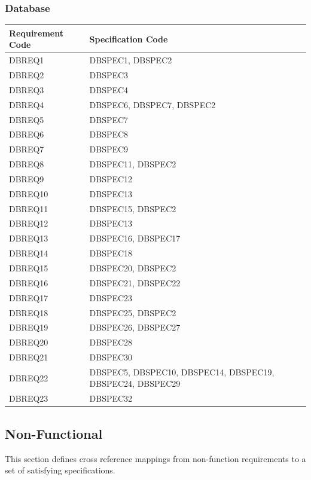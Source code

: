 \documentclass[11pt,a4paper]{article}
\begin{document}
\subsubsection{Database}

\begin{longtable}{|p{2.7cm}|p{10cm}|}
\hline
\textbf{Requirement Code} & \textbf{Specification Code} \\
\hline
{DBREQ1} &
{DBSPEC1, DBSPEC2}\\\hline
{DBREQ2} &
{DBSPEC3}\\\hline
{DBREQ3} &
{DBSPEC4}\\\hline
{DBREQ4} &
{DBSPEC6, DBSPEC7, DBSPEC2}\\\hline
{DBREQ5} &
{DBSPEC7}\\\hline
{DBREQ6} &
{DBSPEC8}\\\hline
{DBREQ7} &
{DBSPEC9}\\\hline
{DBREQ8} &
{DBSPEC11, DBSPEC2}\\\hline
{DBREQ9} &
{DBSPEC12}\\\hline
{DBREQ10} &
{DBSPEC13}\\\hline
{DBREQ11} &
{DBSPEC15, DBSPEC2}\\\hline
{DBREQ12} &
{DBSPEC13}\\\hline
{DBREQ13} &
{DBSPEC16, DBSPEC17}\\\hline
{DBREQ14} &
{DBSPEC18}\\\hline
{DBREQ15} &
{DBSPEC20, DBSPEC2}\\\hline
{DBREQ16} &
{DBSPEC21, DBSPEC22}\\\hline
{DBREQ17} &
{DBSPEC23}\\\hline
{DBREQ18} &
{DBSPEC25, DBSPEC2}\\\hline
{DBREQ19} &
{DBSPEC26, DBSPEC27}\\\hline
{DBREQ20} &
{DBSPEC28}\\\hline
{DBREQ21} &
{DBSPEC30}\\\hline
{DBREQ22} &
{DBSPEC5, DBSPEC10, DBSPEC14, DBSPEC19, DBSPEC24, DBSPEC29}\\\hline
{DBREQ23} &
{DBSPEC32}\\\hline
\end{longtable}


\subsection{Non-Functional}

This section defines cross reference mappings from non-function requirements to a set of satisfying specifications.
\end{document}
